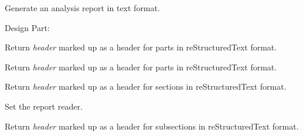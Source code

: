 \documentclass[letterpaper,10pt,english]{sphinxmanual}
\begin{document}
\begin{fulllineitems}
\label{setlyze/std:setlyze.std.ExportTextReport}
Generate an analysis report in text format.

Design Part:

\begin{fulllineitems}
\label{setlyze/std:setlyze.std.ExportTextReport.chapter}
Return \emph{header} marked up as a header for parts in
reStructuredText format.

\end{fulllineitems}


\begin{fulllineitems}
\label{setlyze/std:setlyze.std.ExportTextReport.part}
Return \emph{header} marked up as a header for parts in
reStructuredText format.

\end{fulllineitems}


\begin{fulllineitems}
\label{setlyze/std:setlyze.std.ExportTextReport.section}
Return \emph{header} marked up as a header for sections in
reStructuredText format.

\end{fulllineitems}


\begin{fulllineitems}
\label{setlyze/std:setlyze.std.ExportTextReport.set_report_reader}
Set the report reader.

\end{fulllineitems}


\begin{fulllineitems}
\label{setlyze/std:setlyze.std.ExportTextReport.subsection}
Return \emph{header} marked up as a header for subsections in
reStructuredText format.


\end{fulllineitems}
\end{fulllineitems}
\end{document}
